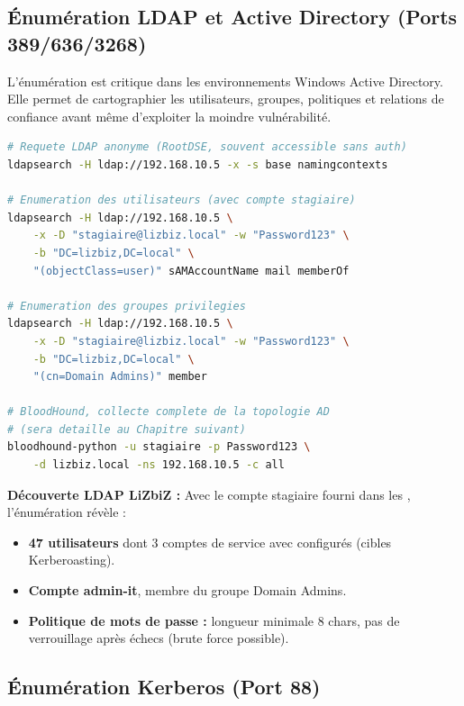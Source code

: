 \subsection{Énumération LDAP et Active Directory (Ports 389/636/3268)}
\label{subsec:ldap_enum}

L'énumération  est critique dans les environnements Windows
Active Directory. Elle permet de cartographier les utilisateurs, groupes,
politiques et relations de confiance avant même d'exploiter la moindre
vulnérabilité.

\begin{lstlisting}[language=bash, caption={Énumération LDAP et Active Directory}]
# Requete LDAP anonyme (RootDSE, souvent accessible sans auth)
ldapsearch -H ldap://192.168.10.5 -x -s base namingcontexts

# Enumeration des utilisateurs (avec compte stagiaire)
ldapsearch -H ldap://192.168.10.5 \
    -x -D "stagiaire@lizbiz.local" -w "Password123" \
    -b "DC=lizbiz,DC=local" \
    "(objectClass=user)" sAMAccountName mail memberOf

# Enumeration des groupes privilegies
ldapsearch -H ldap://192.168.10.5 \
    -x -D "stagiaire@lizbiz.local" -w "Password123" \
    -b "DC=lizbiz,DC=local" \
    "(cn=Domain Admins)" member

# BloodHound, collecte complete de la topologie AD
# (sera detaille au Chapitre suivant)
bloodhound-python -u stagiaire -p Password123 \
    -d lizbiz.local -ns 192.168.10.5 -c all
\end{lstlisting}

\begin{boxlizbiz}
\textbf{Découverte LDAP LiZbiZ :}
Avec le compte \og{}stagiaire\fg{} fourni dans les , l'énumération
\sigle{LDAP} révèle :
\begin{itemize}
    \item \textbf{47 utilisateurs} dont 3 comptes de service avec
           configurés (cibles Kerberoasting).
    \item \textbf{Compte admin-it}, membre du groupe
          \og{}Domain Admins\fg{}.
    \item \textbf{Politique de mots de passe :} longueur minimale 8 chars,
          pas de verrouillage après échecs (brute force possible).
\end{itemize}
\end{boxlizbiz}

\subsection{Énumération Kerberos (Port 88)}
\label{subsec:kerb_enum}

